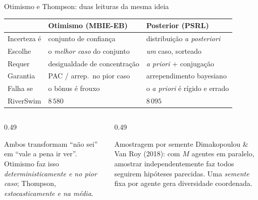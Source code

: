 \documentclass[aspectratio=169, 11pt]{beamer}
\begin{document}
\begin{frame}{Otimismo e Thompson: duas leituras da mesma ideia}
  \centering\small
  \begin{tabular}{@{}l>{\raggedright\arraybackslash}p{}>{\raggedright\arraybackslash}p{}@{}}
    \toprule
     & \textbf{Otimismo (MBIE-EB)} & \textbf{Posterior (PSRL)} \\
    \midrule
    Incerteza é & conjunto de confiança & distribuição \textit{a posteriori} \\
    Escolhe     & o \emph{melhor caso} do conjunto & \emph{um} caso, sorteado \\
    Requer      & desigualdade de concentração & \textit{a priori} + conjugação \\
    Garantia    & PAC / arrep.\ no pior caso & arrependimento bayesiano \\
    Falha se    & o bônus é frouxo & o \textit{a priori} é rígido e errado \\
    RiverSwim   & $8\,580$ & $8\,095$ \\
    \bottomrule
  \end{tabular}
  \vspace{0.5em}
  \begin{columns}[T]
    \begin{column}{0.49\textwidth}
      \begin{ideiabox}
        Ambos transformam ``não sei'' em ``vale a pena ir ver''. Otimismo faz isso
        \emph{deterministicamente e no pior caso}; Thompson, \emph{estocasticamente e
        na média}.
      \end{ideiabox}
    \end{column}
    \begin{column}{0.49\textwidth}
      \begin{teobox}{Amostragem por semente}
        Dimakopoulou \& Van Roy (2018): com $M$ agentes em paralelo, amostrar
        independentemente faz todos seguirem hipóteses parecidas. Uma \emph{semente}
        fixa por agente gera diversidade coordenada.
      \end{teobox}
    \end{column}
  \end{columns}
\end{frame}
\end{document}
